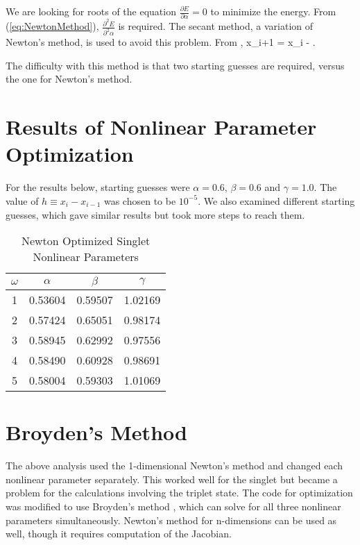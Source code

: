 \documentclass[Dissertation.tex]{subfiles}
\begin{document}
We are looking for roots of the equation $\displaystyle\frac{\partial E}{\partial \alpha} = 0$ to minimize the energy.  From (\ref{eq:NewtonMethod}), $\displaystyle\frac{\partial^2 E}{\partial^2 \alpha}$ is required.  The secant method, a variation of Newton's method, is used to avoid this problem.  From \cite{Sauer2006},
\beq
x_{i+1} = x_i - .
\eeq

\noindent The difficulty with this method is that two starting guesses are required, versus the one for Newton's method.

\section{Results of Nonlinear Parameter Optimization}

For the results below, starting guesses were $\alpha = 0.6$, $\beta = 0.6$ and $\gamma = 1.0$.  The value of $h \equiv x_i - x_{i-1}$ was chosen to be $10^{-5}$.  We also examined different starting guesses, which gave similar results but took more steps to reach them.


\setlength{\abovecaptionskip}{6pt}   %
\setlength{\belowcaptionskip}{6pt}   %
\begin{table}[ht]
\caption{Newton Optimized Singlet Nonlinear Parameters}
\centering
\begin{tabular}{c c c c}
\hline\hline
$\omega$ & $\alpha$ & $\beta$ & $\gamma$ \\ [0.5ex]
\hline
1 & 0.53604 & 0.59507 & 1.02169 \\
2 & 0.57424 & 0.65051 & 0.98174 \\
3 & 0.58945 & 0.62992 & 0.97556 \\
4 & 0.58490 & 0.60928 & 0.98691 \\
5 & 0.58004 & 0.59303 & 1.01069 \\
\hline\hline
\end{tabular}
\label{table:NonlinearOptimized1SNewton}
\end{table}


\section{Broyden's Method}
The above analysis used the 1-dimensional Newton's method and changed each nonlinear parameter separately.  This worked well for the singlet but became a problem for the calculations involving the triplet state.  The code for optimization was modified to use Broyden's method \cite{Sauer2006}, which can solve for all three nonlinear parameters simultaneously.  Newton's method for n-dimensions can be used as well, though it requires computation of the Jacobian.
\end{document}
